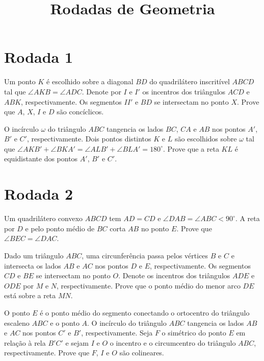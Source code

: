 \documentclass[10pt, a4paper]{article}
\title{Rodadas de Geometria}
\author{} %
\begin{document}
	
	\zeustitle
	\section{Rodada 1}
	\begin{prob}[Rússia 2008]
		Um ponto $K$ é escolhido sobre a diagonal $BD$ do quadrilátero inscritível $ABCD$ tal que $\angle AKB = \angle ADC$. Denote por $I$ e $I'$ os incentros dos triângulos $ACD$ e $ABK$, respectivamente. Os segmentos $II'$ e $BD$ se intersectam no ponto $X$. Prove que $A$, $X$, $I$ e $D$ são concíclicos.
	\end{prob}
	\begin{prob}[Rússia 2008]
		O incírculo $\omega$ do triângulo $ABC$ tangencia os lados $BC$, $CA$ e $AB$ nos pontos $A'$, $B'$ e $C'$, respectivamente. Dois pontos distintos $K$ e $L$ são escolhidos sobre $\omega$ tal que $\angle AKB' + \angle BKA' = \angle ALB' + \angle BLA' = 180^\circ$. Prove que a reta $KL$ é equidistante dos pontos $A'$, $B'$ e $C'$.
	\end{prob}

	\section{Rodada 2}
	\begin{prob}[Bulgária 1998] %
		Um quadrilátero convexo $ABCD$ tem $AD = CD$ e $\angle DAB = \angle ABC < 90^\circ$. A reta por $D$ e pelo ponto médio de $BC$ corta $AB$ no ponto $E$. Prove que $\angle BEC = \angle DAC$.
	\end{prob}
	\begin{prob}[Rússia 2007]
		Dado um triângulo $ABC$, uma circunferência passa pelos vértices $B$ e $C$ e intersecta os lados $AB$ e $AC$ nos pontos $D$ e $E$, respectivamente. Os segmentos $CD$ e $BE$ se intersectam no ponto $O$. Denote os incentros dos triângulos $ADE$ e $ODE$ por $M$ e $N$, respectivamente. Prove que o ponto médio do menor arco $DE$ está sobre a reta $MN$.
	\end{prob}
	\begin{prob}[Rússia 2012]
		O ponto $E$ é o ponto médio do segmento conectando o ortocentro do triângulo escaleno $ABC$ e o ponto $A$. O incírculo do triângulo $ABC$ tangencia os lados $AB$ e $AC$ nos pontos $C'$ e $B'$, respectivamente. Seja $F$ o simétrico do ponto $E$ em relação à rela $B'C'$ e sejam $I$ e $O$ o incentro e o circumcentro do triângulo $ABC$, respectivamente. Prove que $F$, $I$ e $O$ são colineares.
	\end{prob}
\end{document}
